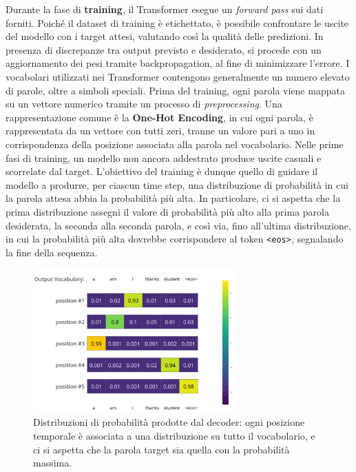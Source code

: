 Durante la fase di \textbf{training}, il Transformer esegue un \textit{forward pass} sui dati forniti. Poiché il dataset di training è etichettato, è possibile confrontare le uscite del modello con i target attesi, valutando così la qualità delle predizioni. In presenza di discrepanze tra output previsto e desiderato, si procede con un aggiornamento dei pesi tramite backpropagation, al fine di minimizzare l’errore. I vocabolari utilizzati nei Transformer contengono generalmente un numero elevato di parole, oltre a simboli speciali. Prima del training, ogni parola viene mappata su un vettore numerico tramite un processo di \textit{preprocessing}. Una rappresentazione comune è la \textbf{One-Hot Encoding}, in cui ogni parola, è rappresentata da un vettore con tutti zeri, tranne un valore pari a uno in corrispondenza della posizione associata alla parola nel vocabolario. Nelle prime fasi di training, un modello non ancora addestrato produce uscite casuali e scorrelate dal target. L’obiettivo del training è dunque quello di guidare il modello a produrre, per ciascun time step, una distribuzione di probabilità in cui la parola attesa abbia la probabilità più alta. In particolare, ci si aspetta che la prima distribuzione assegni il valore di probabilità più alto alla prima parola desiderata, la seconda alla seconda parola, e così via, fino all’ultima distribuzione, in cui la probabilità più alta dovrebbe corrispondere al token \texttt{<eos>}, segnalando la fine della sequenza.

\begin{figure}
    \centering
    \includegraphics[width=0.7\textwidth]{figure/TrainExpectation}
    \caption{Distribuzioni di probabilità prodotte dal decoder: ogni posizione temporale è associata a una distribuzione su tutto il vocabolario, e ci si aspetta che la parola target sia quella con la probabilità massima.}
    \label{fig:trainExp}
\end{figure}

